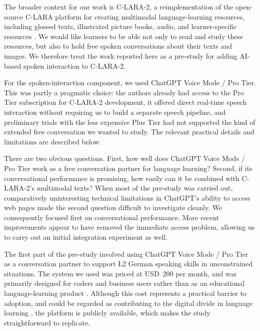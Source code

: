 \documentclass[11pt,a4paper]{article}
\begin{document}
The broader context for our work is C-LARA-2, a reimplementation of the open-source C-LARA platform for creating multimodal language-learning resources, including glossed texts, illustrated picture books, audio, and learner-specific resources \citep{BediEtAl2025}. We would like learners to be able not only to read and study these resources, but also to hold free spoken conversations about their texts and images. We therefore treat the work reported here as a pre-study for adding AI-based spoken interaction to C-LARA-2.

For the spoken-interaction component, we used ChatGPT Voice Mode / Pro Tier. This was partly a pragmatic choice: the authors already had access to the Pro Tier subscription for C-LARA-2 development, it offered direct real-time speech interaction without requiring us to build a separate speech pipeline, and preliminary trials with the less expensive Plus Tier had not supported the kind of extended free conversation we wanted to study. The relevant practical details and limitations are described below.

There are two obvious questions. First, how well does ChatGPT Voice Mode / Pro Tier work as a free conversation partner for language learning? Second, if its conversational performance is promising, how easily can it be combined with C-LARA-2's multimodal texts? When most of the pre-study was carried out, comparatively uninteresting technical limitations in ChatGPT's ability to access web pages made the second question difficult to investigate cleanly. We consequently focused first on conversational performance. More recent improvements appear to have removed the immediate access problem, allowing us to carry out an initial integration experiment as well.

The first part of the pre-study involved using ChatGPT Voice Mode / Pro Tier as a conversation partner to support L2 German speaking skills in unconstrained situations. The system we used was priced at USD~200 per month, and was primarily designed for coders and business users rather than as an educational language-learning product \citep{Reuters2024}. Although this cost represents a practical barrier to adoption, and could be regarded as contributing to the digital divide in language learning \citep{Yaman2015}, the platform is publicly available, which makes the study straightforward to replicate.
\end{document}
